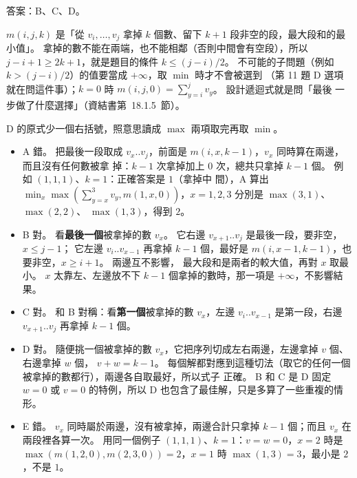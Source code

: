 \begin{pastsoln}
答案：B、C、D。

$m(i, j, k)$ 是「從 $v_i, \ldots, v_j$ 拿掉 $k$ 個數、留下 $k + 1$ 段非空的段，最大段和的最小值」。
拿掉的數不能在兩端，也不能相鄰（否則中間會有空段），所以 $j - i + 1 \ge 2k + 1$，就是題目的條件
$k \le (j - i)/2$。 不可能的子問題（例如 $k > (j - i)/2$）的值要當成 $+\infty$，取 $\min$ 時才不會被選到
（第 11 題 D 選項就在問這件事）；$k = 0$ 時 $m(i, j, 0) = \sum_{y=i}^{j} v_y$。 設計遞迴式就是問「最後
一步做了什麼選擇」（資結書第~18.1.5~節）。

D 的原式少一個右括號，照意思讀成 $\max$ 兩項取完再取 $\min$。
\begin{itemize}
\item A 錯。 把最後一段取成 $v_x..v_j$，前面是 $m(i, x, k-1)$，$v_x$ 同時算在兩邊，而且沒有任何數被拿
掉：$k - 1$ 次拿掉加上 $0$ 次，總共只拿掉 $k - 1$ 個。 例如 $(1, 1, 1)$、$k = 1$：正確答案是 $1$（拿掉中
間），A 算出 $\min_x \max(\sum_{y=x}^{3} v_y, m(1, x, 0))$，$x = 1, 2, 3$ 分別是 $\max(3, 1)$、$\max(2, 2)$、
$\max(1, 3)$，得到 $2$。
\item B 對。 看\textbf{最後一個}被拿掉的數 $v_x$。 它右邊 $v_{x+1}..v_j$ 是最後一段，要非空，$x \le j - 1$；
它左邊 $v_i..v_{x-1}$ 再拿掉 $k - 1$ 個，最好是 $m(i, x - 1, k - 1)$，也要非空，$x \ge i + 1$。 兩邊互不影響，
最大段和是兩者的較大值，再對 $x$ 取最小。 $x$ 太靠左、左邊放不下 $k - 1$ 個拿掉的數時，那一項是
$+\infty$，不影響結果。
\item C 對。 和 B 對稱：看\textbf{第一個}被拿掉的數 $v_x$，左邊 $v_i..v_{x-1}$ 是第一段，右邊
$v_{x+1}..v_j$ 再拿掉 $k - 1$ 個。
\item D 對。 隨便挑一個被拿掉的數 $v_x$，它把序列切成左右兩邊，左邊拿掉 $v$ 個、右邊拿掉 $w$ 個，
$v + w = k - 1$。 每個解都對應到這種切法（取它的任何一個被拿掉的數都行），兩邊各自取最好，所以式子
正確。 B 和 C 是 D 固定 $w = 0$ 或 $v = 0$ 的特例，所以 D 也包含了最佳解，只是多算了一些重複的情形。
\item E 錯。 $v_x$ 同時屬於兩邊，沒有被拿掉，兩邊合計只拿掉 $k - 1$ 個；而且 $v_x$ 在兩段裡各算一次。
用同一個例子 $(1, 1, 1)$、$k = 1$：$v = w = 0$，$x = 2$ 時是 $\max(m(1,2,0), m(2,3,0)) = 2$，$x = 1$ 時
$\max(1, 3) = 3$，最小是 $2$，不是 $1$。
\end{itemize}
\end{pastsoln}
